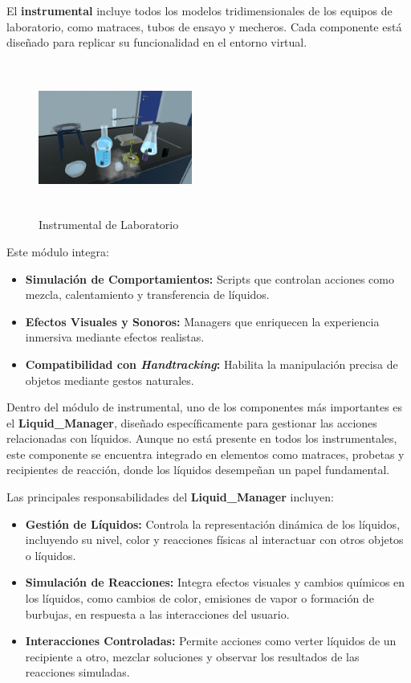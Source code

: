 \documentclass[conference]{IEEEtran}
\begin{document}
El \textbf{instrumental} incluye todos los modelos tridimensionales de los equipos de laboratorio, como matraces, tubos de ensayo y mecheros. Cada componente está diseñado para replicar su funcionalidad en el entorno virtual\cite{alfa_nauta}\cite{Cinetica_Quimica_Basica}. 
\begin{figure}[thbp]
    \centering
    \includegraphics[width=0.45\textwidth, height = 5cm]{img/Instrumental.png}
    \caption{Instrumental de Laboratorio}
    \label{fig:Instrumental de Laboratorio}
\end{figure}

Este módulo integra:
\begin{itemize}
    \item \textbf{Simulación de Comportamientos:} Scripts que controlan acciones como mezcla, calentamiento y transferencia de líquidos.
    \item \textbf{Efectos Visuales y Sonoros:} Managers que enriquecen la experiencia inmersiva mediante efectos realistas.
    \item \textbf{Compatibilidad con \textit{Handtracking}:} Habilita la manipulación precisa de objetos mediante gestos naturales.
\end{itemize}

Dentro del módulo de instrumental, uno de los componentes más importantes es el \textbf{Liquid\_Manager}, diseñado específicamente para gestionar las acciones relacionadas con líquidos. Aunque no está presente en todos los instrumentales, este componente se encuentra integrado en elementos como matraces, probetas y recipientes de reacción, donde los líquidos desempeñan un papel fundamental.

Las principales responsabilidades del \textbf{Liquid\_Manager} incluyen:
\begin{itemize}
    \item \textbf{Gestión de Líquidos:} Controla la representación dinámica de los líquidos, incluyendo su nivel, color y reacciones físicas al interactuar con otros objetos o líquidos.
    \item \textbf{Simulación de Reacciones:} Integra efectos visuales y cambios químicos en los líquidos, como cambios de color, emisiones de vapor o formación de burbujas, en respuesta a las interacciones del usuario.
    \item \textbf{Interacciones Controladas:} Permite acciones como verter líquidos de un recipiente a otro, mezclar soluciones y observar los resultados de las reacciones simuladas.
\end{itemize}
\end{document}
